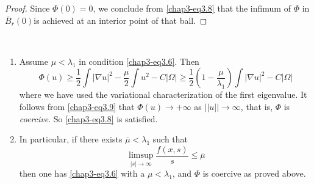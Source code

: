 \begin{proof}
Since $\Phi(0)=0$, we conclude from \eqref{chap3-eq3.8} that the
infimum of $\Phi$ in $\overline{B}_{r}(0)$\pageoriginale is achieved
at an interior point of that ball.
\end{proof}

\begin{remarks*}
~
\begin{enumerate}
\renewcommand{\labelenumi}{(\theenumi)}
\item Assume $\mu<\lambda_{1}$ in condition \eqref{chap3-eq3.6}. Then 
\begin{equation*}
\Phi(u)\geq \frac{1}{2}\int |\nabla u|^{2}-\frac{\mu}{2}\int
u^{2}-C|\Omega|\geq
\frac{1}{2}\left(1-\frac{\mu}{\lambda_{1}}\right)\int |\nabla
u|^{2}-C|\Omega|\tag{3.9}\label{chap3-eq3.9} 
\end{equation*}
where we have used the variational characterization of the first
eigenvalue. It follows from \eqref{chap3-eq3.9} that $\Phi(u)\to
+\infty$ as $||u||\to \infty$, that is, $\Phi$ is {\em coercive}. So
\eqref{chap3-eq3.8} is satisfied.

\item In particular, if there exists $\overline{\mu}<\lambda_{1}$ such
  that
$$
\mathop{\lim\sup}\limits_{|s|\to\infty}\frac{f(x,s)}{s}\leq \overline{\mu}
$$
then one has \eqref{chap3-eq3.6} with a $\mu<\lambda_{1}$, and $\Phi$
is coercive as proved above.


\end{enumerate}
\end{remarks*}
